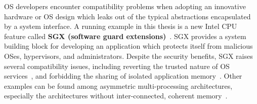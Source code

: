 OS developers encounter compatibility problems when adopting an innovative hardware or OS design
which leaks out of the typical abstractions
encapsulated by a system interface.
A running example in this thesis %
is a new Intel CPU feature called {\bf SGX (software guard extensions)}~\cite{intelsgx}.
SGX provides a system building block for developing
an application which protects itself from malicious OSes, hypervisors, and administrators.
Despite the security benefits,
SGX raises several compatibility issues, including reverting the trusted nature of OS services~\cite{baumann14haven,osdi16scone,tsai17graphene-sgx}, and forbidding the sharing of isolated application memory~\cite{shinde17panoply}.
Other examples can be found among asymmetric multi-processing architectures,
especially the architectures without inter-connected, coherent memory~\cite{gschwind2007,cascaval2002evaluation}. 



